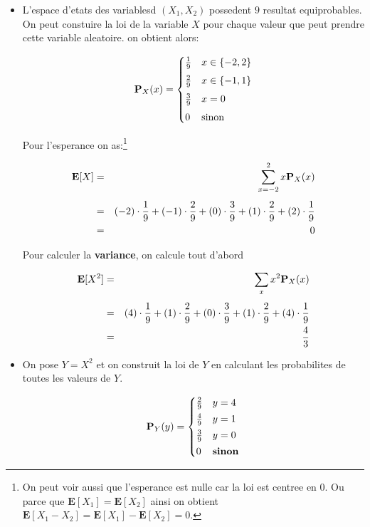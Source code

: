 \documentclass[a4paper]{tufte-handout}
\newcommand{\E}{\mathbf{E}}
\begin{document}
\begin{itemize}
  \item L'espace d'etats des variablesd $(X_1,X_2)$ possedent $9$ resultat
    equiprobables. On peut constuire la loi de la variable $X$ pour chaque
    valeur que peut prendre cette variable aleatoire. on obtient alors:

    $$
    \P_X(x) =\begin{cases}
      \frac{1}{9} & x\in \{-2,2\}\\[4pt]
      \frac{2}{9} & x\in \{-1, 1\}\\[4pt]
      \frac{3}{9} & x = 0\\[4pt]
      0           & \text{sinon}
    \end{cases}
    $$

    Pour l'esperance on as:\footnote{On peut voir aussi que l'esperance est
    nulle car la loi est centree en $0$. Ou parce que $\E[X_1]= \E[X_2]$ ainsi
  on obtient $\E[X_1 - X_2] = \E[X_1] - \E[X_2] = 0$.}

\begin{eqnarray*}
  \E[X] & = & \sum_{x=-2}^2  x\P_X(x)\\[4pt]
        & = & (-2)\cdot \frac{1}{9} + (-1)\cdot \frac{2}{9} + 
(0)\cdot \frac{3}{9} + (1)\cdot \frac{2}{9} + (2)\cdot \frac{1}{9}\\
        & = & 0
\end{eqnarray*}


Pour calculer la \textbf{variance}, on calcule tout d'abord 

\begin{eqnarray*}
  \E[X^2] & = & \sum_x x^2\P_X(x)   \\[4pt]
          & = & (4)\cdot\frac{1}{9} + (1)\cdot\frac{2}{9} + 
(0)\cdot\frac{3}{9} + (1)\cdot\frac{2}{9} + (4)\cdot\frac{1}{9}\\
          & = & \frac{4}{3}
\end{eqnarray*}

\item On pose $Y=X^2$ et on construit la loi de $Y$ en calculant les
  probabilites de toutes les valeurs de $Y$.

  \begin{equation*}
    \P_Y(y) = \begin{cases}
      \frac{2}{9}  & y = 4\\[2pt]
      \frac{4}{9}  & y = 1 \\[2pt]
      \frac{3}{9}  & y = 0 \\[2pt]
      0            & \textbf{sinon}
    \end{cases}
  \end{equation*}


\end{itemize}
\end{document}
